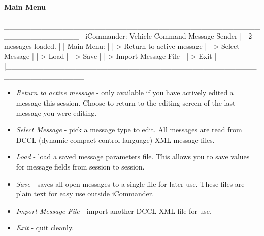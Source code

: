 \paragraph{Main Menu}
\begin{boxedverbatim}
 ______________________________________________________________
|            iCommander: Vehicle Command Message Sender        |
|                        2 messages loaded.                    |
|    Main Menu:                                                |
|    > Return to active message                                |
|    > Select Message                                          |
|    > Load                                                    |
|    > Save                                                    |
|    > Import Message File                                     |
|    > Exit                                                    |
|______________________________________________________________|
\end{boxedverbatim}
\resetbvlinenumber
\begin{itemize}
\item \textit{Return to active message} - only available if you have actively edited a message this session. Choose to return to the editing screen of the last message you were editing.
\item \textit{Select Message} - pick a message type to edit. All messages are read from DCCL (dynamic compact control language) XML message files.
\item \textit{Load} - load a saved message parameters file. This allows you to save values for message fields from session to session.
\item \textit{Save} - saves all open messages to a single file for later use. These files are plain text for easy use outside iCommander.
\item \textit{Import Message File} - import another DCCL XML file for use.
\item \textit{Exit} - quit cleanly.
\end{itemize}

